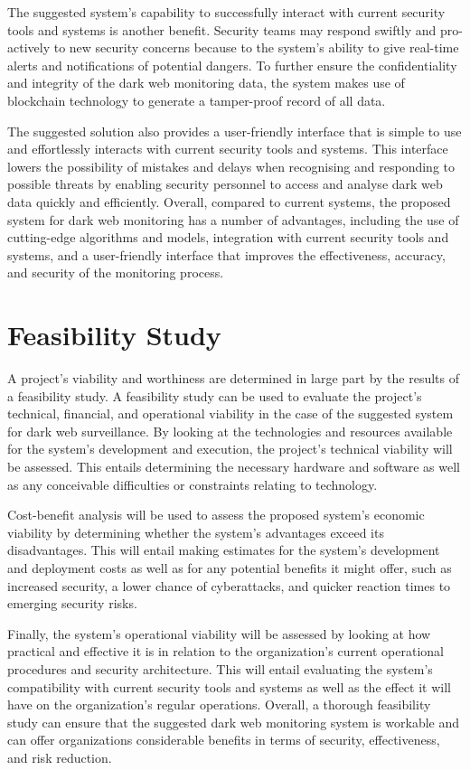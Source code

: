 \documentclass[10pt]{report}
\begin{document}
The suggested system's capability to successfully interact with current security tools and systems is another benefit. Security teams may respond swiftly and pro-actively to new security concerns because to the system's ability to give real-time alerts and notifications of potential dangers. To further ensure the confidentiality and integrity of the dark web monitoring data, the system makes use of blockchain technology to generate a tamper-proof record of all data.

The suggested solution also provides a user-friendly interface that is simple to use and effortlessly interacts with current security tools and systems. This interface lowers the possibility of mistakes and delays when recognising and responding to possible threats by enabling security personnel to access and analyse dark web data quickly and efficiently. Overall, compared to current systems, the proposed system for dark web monitoring has a number of advantages, including the use of cutting-edge algorithms and models, integration with current security tools and systems, and a user-friendly interface that improves the effectiveness, accuracy, and security of the monitoring process.

\section{Feasibility Study}
A project's viability and worthiness are determined in large part by the results of a feasibility study. A feasibility study can be used to evaluate the project's technical, financial, and operational viability in the case of the suggested system for dark web surveillance. By looking at the technologies and resources available for the system's development and execution, the project's technical viability will be assessed. This entails determining the necessary hardware and software as well as any conceivable difficulties or constraints relating to technology.

Cost-benefit analysis will be used to assess the proposed system's economic viability by determining whether the system's advantages exceed its disadvantages. This will entail making estimates for the system's development and deployment costs as well as for any potential benefits it might offer, such as increased security, a lower chance of cyberattacks, and quicker reaction times to emerging security risks.

Finally, the system's operational viability will be assessed by looking at how practical and effective it is in relation to the organization's current operational procedures and security architecture. This will entail evaluating the system's compatibility with current security tools and systems as well as the effect it will have on the organization's regular operations. Overall, a thorough feasibility study can ensure that the suggested dark web monitoring system is workable and can offer organizations considerable benefits in terms of security, effectiveness, and risk reduction.
\end{document}
